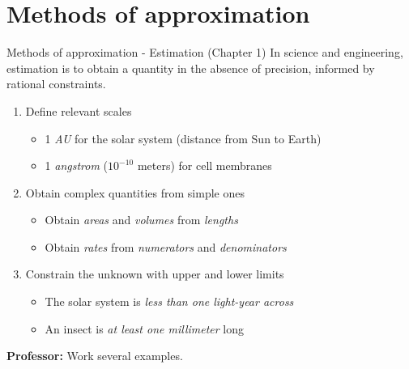 \documentclass{beamer}
\begin{document}
\section{Methods of approximation}

\begin{frame}{Methods of approximation - Estimation (Chapter 1)}
In science and engineering, \alert{estimation} is to obtain a quantity in the absence of precision, informed by rational constraints.
\begin{enumerate}
\item Define relevant \alert{scales}
\begin{itemize}
\item 1 \textit{AU} for the solar system (distance from Sun to Earth)
\item 1 \textit{angstrom} ($10^{-10}$ meters) for cell membranes
\end{itemize}
\item Obtain \alert{complex quantities} from simple ones
\begin{itemize}
\item Obtain \textit{areas} and \textit{volumes} from \textit{lengths}
\item Obtain \textit{rates} from \textit{numerators} and \textit{denominators}
\end{itemize}
\item Constrain the unknown with \alert{upper} and \alert{lower} limits
\begin{itemize}
\item The solar system is \textit{less than one light-year across}
\item An insect is \textit{at least one millimeter} long
\end{itemize}
\end{enumerate}
\textbf{Professor:} Work several examples.
\end{frame}
\end{document}
